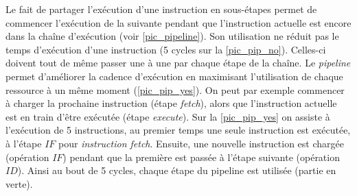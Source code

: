             Le fait de partager l'exécution d'une instruction en sous-étapes permet de commencer l'exécution de la suivante pendant que l'instruction actuelle est encore dans la chaîne d'exécution (voir \autoref{pic_pipeline}). Son utilisation ne réduit pas le temps d'exécution d'une instruction (5 cycles sur la \autoref{pic_pip_no}). Celles-ci doivent tout de même passer une à une par chaque étape de la chaîne. Le \textit{pipeline} permet d'améliorer la cadence d'exécution en maximisant l'utilisation de chaque ressource à un même moment (\autoref{pic_pip_yes}). On peut par exemple commencer à charger la prochaine instruction (étape \textit{fetch}), alors que l'instruction actuelle est en train d'être exécutée (étape \textit{execute}). Sur la \autoref{pic_pip_yes} on assiste à l'exécution de 5 instructions, au premier temps une seule instruction est exécutée, à l'étape $IF$ pour \textit{instruction fetch}. Ensuite, une nouvelle instruction est chargée (opération $IF$) pendant que la première est passée à l'étape suivante (opération $ID$). Ainsi au bout de 5 cycles, chaque étape du pipeline est utilisée (partie en verte). 
            

